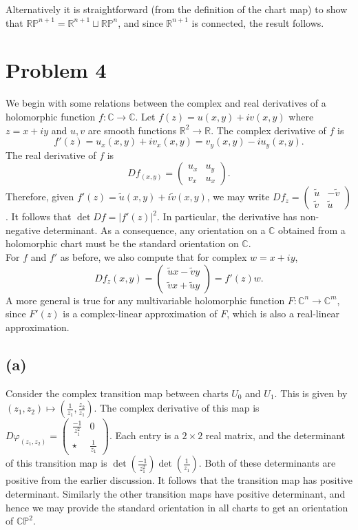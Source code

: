 \documentclass{amsbook}
\theoremstyle{theorem}
\theoremstyle{plain}
\theoremstyle{remark}
\newcommand{\R}{\mathbb R}
\newcommand{\C}{\mathbb C}
\renewcommand{\P}{\mathbb P}
\begin{document}
Alternatively it is straightforward (from the definition of the chart map) to show that $\R\P^{n+1} = \R^{n+1} \sqcup \R\P^n$, and since $\R^{n+1}$ is connected, the result follows.
\chapter*{Problem 4}

We begin with some relations between the complex and real derivatives of a holomorphic function $f: \C \to \C$. Let $f(z) = u(x,y) + iv(x,y)$ where $z=x+iy$ and $u,v$ are smooth functions $\R^2 \to \R$. The complex derivative of $f$ is \[f'(z) = u_x(x,y) + iv_x(x,y) =v_y(x,y) - i u_y(x,y).\] The real derivative of $f$ is \[Df_{(x,y)} =
  \begin{pmatrix}
    u_x & u_y \\ v_x & u_x
  \end{pmatrix}.\] Therefore, given $f'(z) = \tilde u(x,y)+ i\tilde v(x,y)$, we may write $Df_z =
\begin{pmatrix}
  \tilde u & -\tilde v\\
  \tilde v & \tilde u
\end{pmatrix}$. It follows that $\det Df = |f'(z)|^2$. In particular, the derivative has non-negative determinant. As a consequence, any orientation on a $\C$ obtained from a holomorphic chart must be the standard orientation on $\C$. \\

For $f$ and $f'$ as before, we also compute that for complex $w = x + iy$, \[Df_z(x,y) =
  \begin{pmatrix}
    \tilde u x - \tilde v y \\
    \tilde v x + \tilde u y
  \end{pmatrix} = f'(z)w.
\] A more general is true for any multivariable holomorphic function $F:\C^n \to \C^m$, since $F'(z)$ is a complex-linear approximation of $F$, which is also a real-linear approximation.

\section*{(a)}

Consider the complex transition map between charts $U_0$ and $U_1$. This is given by $(z_1, z_2) \mapsto (\frac 1{z_1}, \frac{z_2}{z_1})$. The complex derivative of this map is $ D\varphi_{(z_1, z_2)} = 
\begin{pmatrix}
  \frac{-1}{z_1^2} & 0 \\
  \star & \frac{1}{z_1}
\end{pmatrix}$. Each entry is a $2\times 2$ real matrix, and the determinant of this transition map is $\det (\frac{-1}{z_1^2}) \det (\frac{1}{z_1})$. Both of these determinants are positive from the earlier discussion. It follows that the transition map has positive determinant. Similarly the other transition maps have positive determinant, and hence we may provide the standard orientation in all charts to get an orientation of $\C\P^2$.
\end{document}
